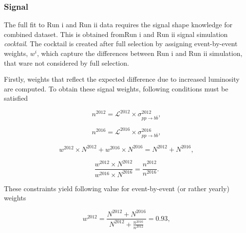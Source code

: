 \subsubsection{Signal}
The full fit to Run \Rn{1} and Run \Rn{2} data requires the signal shape knowledge for combined dataset. This is obtained fromRun \Rn{1} and Run \Rn{2} signal simulation \textit{cocktail}. The cocktail is created after full selection by assigning event-by-event weights, \textit{$w^{i}$}, which capture the differences between Run \Rn{1} and Run \Rn{2} simulation, that ware not considered by full selection.

Firstly, weights that reflect the expected difference due to increased luminosity are computed. To obtain these signal weights, following conditions must be satisfied

\begin{equation}
n^{2012}=\mathcal{L}^{2012} \times \sigma^{2012}_{pp \rightarrow b \overline{b}},
\end{equation}

\begin{equation}
n^{2016}=\mathcal{L}^{2016} \times \sigma^{2016}_{pp \rightarrow b \overline{b}},
\end{equation}

\begin{equation}
w^{2012} \times N^{2012} + w^{2016} \times N^{2016} = N^{2012} + N^{2016},
\end{equation}

\begin{equation}
\frac{w^{2012} \times N^{2012}}{w^{2016} \times N^{2016}} = \frac{n^{2012}}{n^{2016}}.
\end{equation}

These constraints yield following value for event-by-event (or rather yearly) weights

\begin{equation}
w^{2012}= \frac{N^{2012}+N^{2016}}{N^{2012}+ \frac{n^{2016}}{n^{2012}}}=0.93,
\end{equation}


